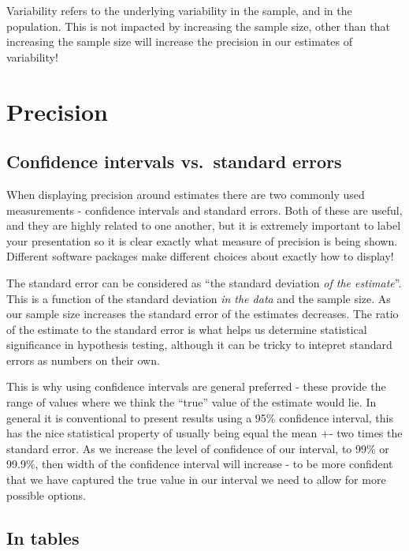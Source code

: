\documentclass[
]{book}
\begin{document}
Variability refers to the underlying variability in the sample, and in the population. This is not impacted by increasing the sample size, other than that increasing the sample size will increase the precision in our estimates of variability!

\hypertarget{precision-1}{%
\section{Precision}\label{precision-1}}

\hypertarget{confidence-intervals-vs.-standard-errors}{%
\subsection{Confidence intervals vs.~standard errors}\label{confidence-intervals-vs.-standard-errors}}

When displaying precision around estimates there are two commonly used measurements - confidence intervals and standard errors. Both of these are useful, and they are highly related to one another, but it is extremely important to label your presentation so it is clear exactly what measure of precision is being shown. Different software packages make different choices about exactly how to display!

The standard error can be considered as ``the standard deviation \emph{of the estimate}''. This is a function of the standard deviation \emph{in the data} and the sample size. As our sample size increases the standard error of the estimates decreases. The ratio of the estimate to the standard error is what helps us determine statistical significance in hypothesis testing, although it can be tricky to intepret standard errors as numbers on their own.

This is why using confidence intervals are general preferred - these provide the range of values where we think the ``true'' value of the estimate would lie. In general it is conventional to present results using a 95\% confidence interval, this has the nice statistical property of usually being equal the mean +- two times the standard error. As we increase the level of confidence of our interval, to 99\% or 99.9\%, then width of the confidence interval will increase - to be more confident that we have captured the true value in our interval we need to allow for more possible options.

\hypertarget{in-tables}{%
\subsection{In tables}\label{in-tables}}
\end{document}
